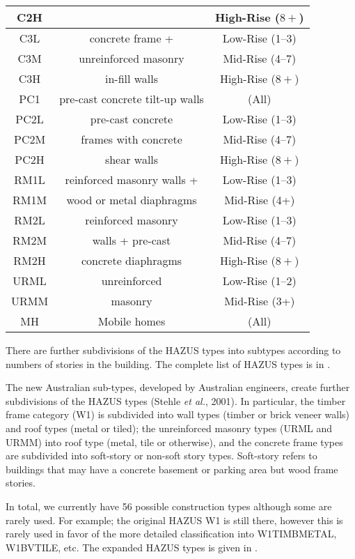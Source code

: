 \begin{table}
\begin{tabular}{|c|c|c|}
C2H & & High-Rise ($8+$)\\
\hline
C3L & concrete frame + & Low-Rise (1--3)\\
C3M & unreinforced masonry & Mid-Rise (4--7)\\
C3H & in-fill walls & High-Rise ($8+$)\\
\hline
PC1 & pre-cast concrete tilt-up walls & (All)\\
\hline
PC2L & pre-cast concrete  & Low-Rise (1--3)\\
PC2M &  frames with concrete  & Mid-Rise (4--7)\\
PC2H & shear walls & High-Rise ($8+$)\\
\hline
RM1L & reinforced masonry walls + & Low-Rise (1--3)\\
RM1M & wood or metal diaphragms  & Mid-Rise (4+)\\
\hline
RM2L & reinforced masonry & Low-Rise (1--3)\\
RM2M & walls + pre-cast & Mid-Rise (4--7)\\
RM2H & concrete diaphragms & High-Rise ($8+$)\\
\hline
URML & unreinforced & Low-Rise (1--2)\\
URMM & masonry & Mid-Rise (3+)\\
\hline
MH & Mobile homes & (All)\\
  \hline
\end{tabular}
\end{table}

There are further subdivisions of the HAZUS types into subtypes
according to numbers of stories in the building. The complete list of
HAZUS types is in .

The new Australian sub-types, developed by Australian engineers,
create further subdivisions of the HAZUS types
(Stehle \textit{et al.}, 2001). %
In particular, the timber frame category
(W1) is subdivided into wall types (timber or brick veneer walls)
and roof types (metal or tiled); the unreinforced masonry types
(URML and URMM) into roof type (metal, tile or  otherwise), and
the concrete frame types are subdivided into soft-story or
non-soft story types. Soft-story refers to buildings that may have
a concrete basement or parking area but wood frame stories.

In total, we currently have 56 possible construction types
although some are rarely used. For example; the original HAZUS W1
is still there, however this is rarely used in favor of the more
detailed classification into W1TIMBMETAL, W1BVTILE, etc. The
expanded HAZUS types is given in
.

